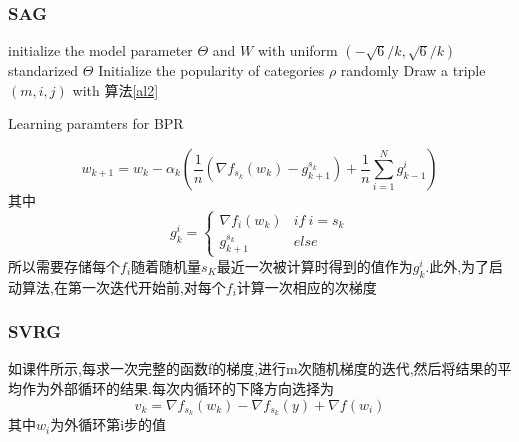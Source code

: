 \documentclass[UTF8]{ctexart}
\begin{document}
  \subsubsection{SAG}

\begin{algorithm}

    \SetAlgoNoLine %

    \BlankLine

    initialize the model parameter $\Theta$ and $W$ with uniform $\left(-\sqrt{6}/{k},\sqrt{6}/{k}\right)$\; %
    standarized $\Theta$\;
    Initialize the popularity of categories $\rho$ randomly\;
    \Repeat
        {}
        {Draw a triple $\left(m,i,j\right)$ with 算法\ref{al2}\;
        }
    \caption{Learning paramters for BPR\label{al3}}
\end{algorithm}

  $$w_{k+1}=w_k-\alpha_k(\frac{1}{n}(\nabla f_{s_k}(w_k)-g_{k+1}^{s_k})+\frac{1}{n}\sum_{i=1}^{N}g_{k-1}^i)$$
  其中
  \begin{equation*}
    g_k^i= \left\{
    \begin{array}{cc}
      \nabla f_{i}(w_k) &if\ i=s_k\\
      g_{k+1}^{s_k} & else
    \end{array}
    \right.
  \end{equation*}
  所以需要存储每个$f_i$随着随机量$s_K$最近一次被计算时得到的值作为$g_k^i$.此外,为了启动算法,在第一次迭代开始前,对每个$f_i$计算一次相应的次梯度
  \subsubsection{SVRG}
  如课件所示,每求一次完整的函数f的梯度,进行m次随机梯度的迭代,然后将结果的平均作为外部循环的结果.每次内循环的下降方向选择为
  $$
  v_k=\nabla f_{s_k}(w_k)-\nabla f_{s_k}(y)+\nabla f(w_i)
$$
其中$w_i$为外循环第i步的值
\end{document}
